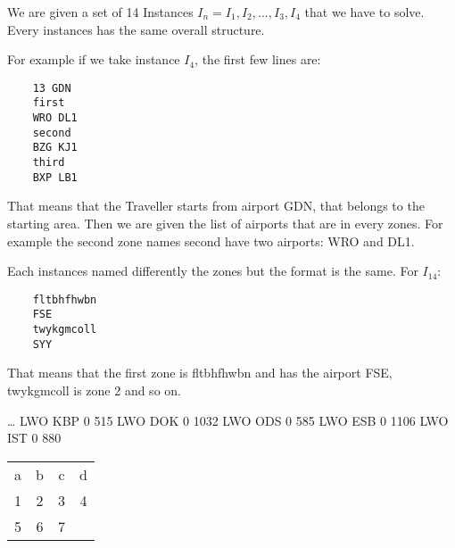 We are given a set of 14 Instances $I_{n}={I_1,I_2,...,I_3,I_4}$ that we have to solve.
Every instances has the same overall structure.

For example if we take instance $I_4$, the first few lines are:

\begin{verbatim}
    13 GDN
    first
    WRO DL1
    second
    BZG KJ1
    third
    BXP LB1
\end{verbatim}

That means that the Traveller starts from airport GDN, that belongs to the starting area.
Then we are given the list of airports that are in every zones.
For example the second zone names second have two airports: WRO and DL1.

Each instances named differently the zones but the format is the same. For $I_14$:
\begin{verbatim}
    fltbhfhwbn
    FSE
    twykgmcoll
    SYY
\end{verbatim}


That means that the first zone is fltbhfhwbn and has the airport FSE, twykgmcoll is zone 2 and so on.


\dots
LWO KBP 0 515
LWO DOK 0 1032
LWO ODS 0 585
LWO ESB 0 1106
LWO IST 0 880


\begin{center}
    \begin{tabular}{||c c c c||} 
        a & b & c & d\\
       1 & 2 & 3 & 4\\
       5 & 6 & 7\\
    \end{tabular}
\end{center}